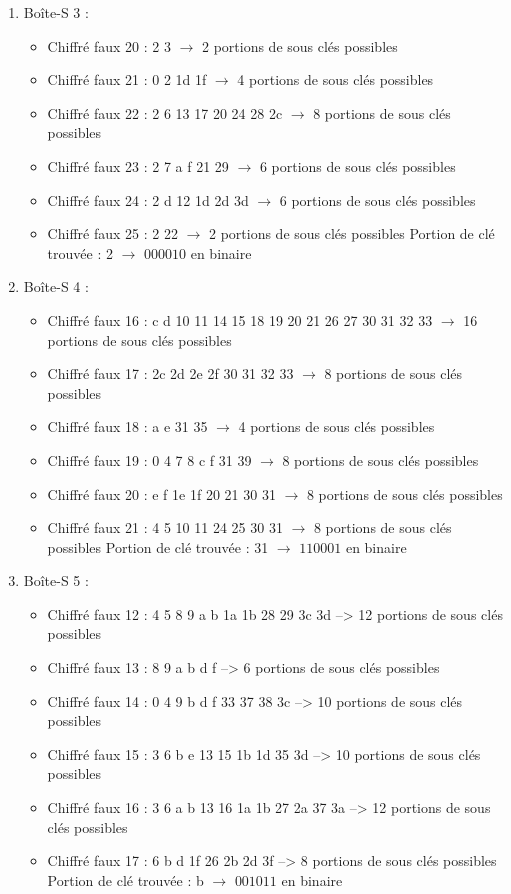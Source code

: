 \documentclass[11pt]{article}
\begin{document}
\begin{enumerate}
\item Boîte-S 3 : 
\begin{itemize}
	\item Chiffré faux 20 : 2 3 $\longrightarrow$ 2 portions de sous clés possibles
	\item Chiffré faux 21 : 0 2 1d 1f $\longrightarrow$ 4 portions de sous clés possibles
	\item Chiffré faux 22 : 2 6 13 17 20 24 28 2c $\longrightarrow$ 8 portions de sous clés possibles
	\item Chiffré faux 23 : 2 7 a f 21 29 $\longrightarrow$ 6 portions de sous clés possibles
	\item Chiffré faux 24 : 2 d 12 1d 2d 3d $\longrightarrow$ 6 portions de sous clés possibles
	\item Chiffré faux 25 : 2 22 $\longrightarrow$ 2 portions de sous clés possibles \newline
	Portion de clé trouvée : 2 $\longrightarrow$ $000010$ en binaire
\end{itemize}

\item Boîte-S 4 : 
\begin{itemize}
	\item Chiffré faux 16 : c d 10 11 14 15 18 19 20 21 26 27 30 31 32 33 $\longrightarrow$ 16 portions de sous clés possibles
	\item Chiffré faux 17 : 2c 2d 2e 2f 30 31 32 33 $\longrightarrow$ 8 portions de sous clés possibles
	\item Chiffré faux 18 : a e 31 35 $\longrightarrow$ 4 portions de sous clés possibles
	\item Chiffré faux 19 : 0 4 7 8 c f 31 39 $\longrightarrow$ 8 portions de sous clés possibles
	\item Chiffré faux 20 : e f 1e 1f 20 21 30 31 $\longrightarrow$ 8 portions de sous clés possibles
	\item Chiffré faux 21 : 4 5 10 11 24 25 30 31 $\longrightarrow$ 8 portions de sous clés possibles \newline
	Portion de clé trouvée : 31 $\longrightarrow$ $110001$ en binaire
\end{itemize}

\item Boîte-S 5 : 
\begin{itemize}
	\item Chiffré faux 12 : 4 5 8 9 a b 1a 1b 28 29 3c 3d --> 12 portions de sous clés possibles
	\item Chiffré faux 13 : 8 9 a b d f --> 6 portions de sous clés possibles
	\item Chiffré faux 14 : 0 4 9 b d f 33 37 38 3c --> 10 portions de sous clés possibles
	\item Chiffré faux 15 : 3 6 b e 13 15 1b 1d 35 3d --> 10 portions de sous clés possibles
	\item Chiffré faux 16 : 3 6 a b 13 16 1a 1b 27 2a 37 3a --> 12 portions de sous clés possibles
	\item Chiffré faux 17 : 6 b d 1f 26 2b 2d 3f --> 8 portions de sous clés possibles \newline
	Portion de clé trouvée : b $\longrightarrow$ $001011$ en binaire
\end{itemize}


\end{enumerate}
\end{document}
